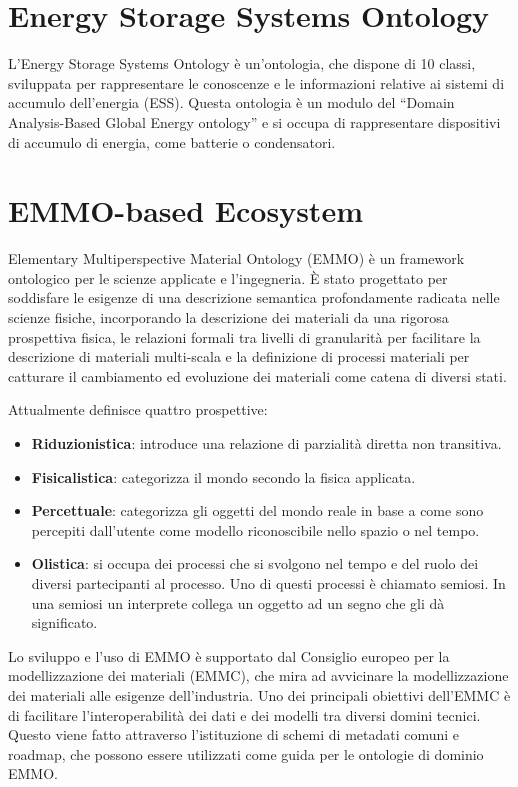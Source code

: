 \section{Energy Storage Systems Ontology}
L'Energy Storage Systems Ontology \cite{EnergyStorageSystemOntology} è
un'ontologia, che dispone di 10 classi, sviluppata per
rappresentare le conoscenze e le informazioni relative ai sistemi di accumulo
dell'energia (ESS). Questa ontologia è un modulo del “Domain Analysis-Based
Global Energy ontology” e si occupa di rappresentare dispositivi di accumulo di
energia, come batterie o condensatori.

\section{EMMO-based Ecosystem}
Elementary Multiperspective Material Ontology (EMMO) \cite{emmo} è un
framework ontologico per le
scienze applicate e l'ingegneria. È stato progettato per soddisfare le esigenze
di una descrizione semantica profondamente radicata nelle scienze fisiche,
incorporando la descrizione dei materiali da una rigorosa prospettiva fisica,
le relazioni formali tra livelli di granularità per facilitare la descrizione
di materiali multi-scala e la definizione di processi materiali per catturare
il cambiamento ed evoluzione dei materiali come catena di diversi stati.

Attualmente definisce quattro prospettive:
\begin{itemize}
    \item \textbf{Riduzionistica}: introduce una relazione di
          parzialità diretta non transitiva.
    \item \textbf{Fisicalistica}: categorizza il mondo
          secondo la fisica applicata.
    \item \textbf{Percettuale}: categorizza gli oggetti del mondo reale in base
          a come sono percepiti dall'utente come modello riconoscibile nello
          spazio o nel tempo.
    \item \textbf{Olistica}: si occupa dei processi che si svolgono nel tempo e
          del ruolo dei diversi partecipanti al processo. Uno di questi
          processi è
          chiamato semiosi. In una semiosi un interprete collega un oggetto ad
          un segno
          che gli dà significato.
\end{itemize}

Lo sviluppo e l'uso di EMMO è supportato dal Consiglio europeo per la
modellizzazione dei materiali (EMMC), che mira ad avvicinare la modellizzazione
dei materiali alle esigenze dell'industria. Uno dei principali obiettivi
dell'EMMC è di facilitare l'interoperabilità dei dati e dei modelli tra diversi
domini tecnici. Questo viene fatto attraverso l'istituzione di schemi di
metadati comuni e roadmap, che possono essere utilizzati come guida per le
ontologie di dominio EMMO.

